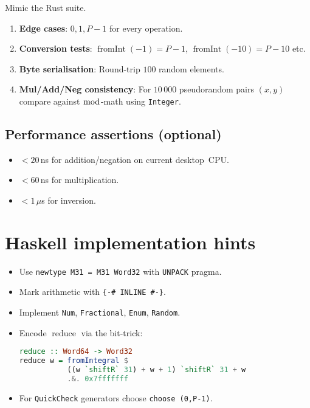 \documentclass{article}
\begin{document}
Mimic the Rust suite.

\begin{enumerate}[label=\textbf{T\arabic*}.]
\item \textbf{Edge cases}:  
      $0,1,P-1$ for every operation.
\item \textbf{Conversion tests}:  
      $\operatorname{fromInt}(-1)=P-1$,  
      $\operatorname{fromInt}(-10)=P-10$ etc.
\item \textbf{Byte serialisation}:  
      Round-trip $100$ random elements.
\item \textbf{Mul/Add/Neg consistency}:  
      For $10\,000$ pseudorandom pairs $(x,y)$ compare
      against \(\bmod\)-math using \verb|Integer|.
\end{enumerate}

\subsection{Performance assertions (optional)}

\begin{itemize}[nosep]
\item \(<\!20\)\,ns for addition/negation on current desktop~CPU.
\item \(<\!60\)\,ns for multiplication.
\item \(<\!1\)\,$\mu$s for inversion.
\end{itemize}

\section{Haskell implementation hints}

\begin{itemize}[nosep]
\item Use \verb|newtype M31 = M31 Word32| with \verb|UNPACK| pragma.
\item Mark arithmetic with \verb|{-# INLINE #-}|.
\item Implement \verb|Num|, \verb|Fractional|, \verb|Enum|, \verb|Random|.
\item Encode \(\operatorname{reduce}\) via the bit-trick:
      \begin{lstlisting}[language=Haskell,basicstyle=\ttfamily\small]
reduce :: Word64 -> Word32
reduce w = fromIntegral $
           ((w `shiftR` 31) + w + 1) `shiftR` 31 + w
           .&. 0x7fffffff
      \end{lstlisting}
\item For \verb|QuickCheck| generators choose \verb|choose (0,P-1)|.
\end{itemize}
\end{document}
